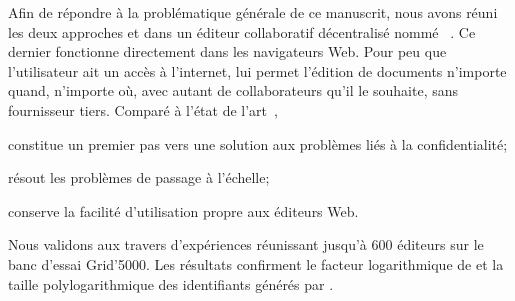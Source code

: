 Afin de répondre à la problématique générale de ce manuscrit, nous avons réuni
les deux approches \LSEQ et \SPRAY dans un éditeur collaboratif décentralisé
nommé \CRATE~\cite{nedelec2016crate}. Ce dernier fonctionne directement dans les
navigateurs Web. Pour peu que l'utilisateur ait un accès à l'internet, \CRATE
lui permet l'édition de documents n'importe quand, n'importe où, avec autant de
collaborateurs qu'il le souhaite, sans fournisseur tiers. Comparé à l'état de
l'art~\cite{etherpad, googledocs, hivejs, lautamaki2012cored,
  nicolaescu2015yjs},
\begin{inparaenum}[(i)]
\item \CRATE constitue un premier pas vers une solution aux problèmes liés à la
  confidentialité;
\item \CRATE résout les problèmes de passage à l'échelle;
\item \CRATE conserve la facilité d'utilisation propre aux éditeurs Web.
\end {inparaenum}
Nous validons \CRATE aux travers d'expériences réunissant jusqu'à 600 éditeurs
sur le banc d'essai Grid'5000. Les résultats confirment le facteur logarithmique
de \SPRAY et la taille polylogarithmique des identifiants générés par \LSEQ.



